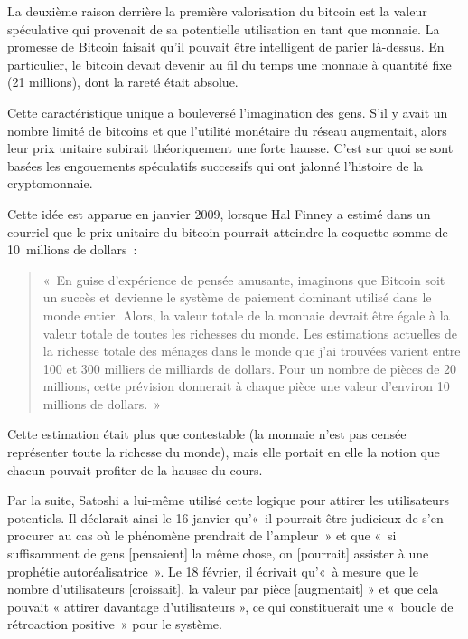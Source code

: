 
La deuxième raison derrière la première valorisation du bitcoin est la valeur spéculative qui provenait de sa potentielle utilisation en tant que monnaie. La promesse de Bitcoin faisait qu'il pouvait être intelligent de parier là-dessus. En particulier, le bitcoin devait devenir au fil du temps une monnaie à quantité fixe (21 millions), dont la rareté était absolue.

Cette caractéristique unique a bouleversé l'imagination des gens. S'il y avait un nombre limité de bitcoins et que l'utilité monétaire du réseau augmentait, alors leur prix unitaire subirait théoriquement une forte hausse. C'est sur quoi se sont basées les engouements spéculatifs successifs qui ont jalonné l'histoire de la cryptomonnaie.

Cette idée est apparue en janvier 2009, lorsque Hal Finney a estimé dans un courriel que le prix unitaire du bitcoin pourrait atteindre la coquette somme de 10~millions de dollars~: 

\begin{quote}
«~En guise d'expérience de pensée amusante, imaginons que Bitcoin soit un succès et devienne le système de paiement dominant utilisé dans le monde entier. Alors, la valeur totale de la monnaie devrait être égale à la valeur totale de toutes les richesses du monde. Les estimations actuelles de la richesse totale des ménages dans le monde que j'ai trouvées varient entre 100 et 300 milliers de milliards de dollars. Pour un nombre de pièces de 20 millions, cette prévision donnerait à chaque pièce une valeur d'environ 10 millions de dollars.~»
\end{quote}

Cette estimation était plus que contestable (la monnaie n'est pas censée représenter toute la richesse du monde), mais elle portait en elle la notion que chacun pouvait profiter de la hausse du cours.

Par la suite, Satoshi a lui-même utilisé cette logique pour attirer les utilisateurs potentiels. Il déclarait ainsi le 16 janvier qu'«~il pourrait être judicieux de s'en procurer au cas où le phénomène prendrait de l'ampleur~» et que «~si suffisamment de gens [pensaient] la même chose, on [pourrait] assister à une prophétie autoréalisatrice~». Le 18 février, il écrivait qu'«~à mesure que le nombre d'utilisateurs [croissait], la valeur par pièce [augmentait] » et que cela pouvait « attirer davantage d'utilisateurs », ce qui constituerait une «~boucle de rétroaction positive~» pour le système.


